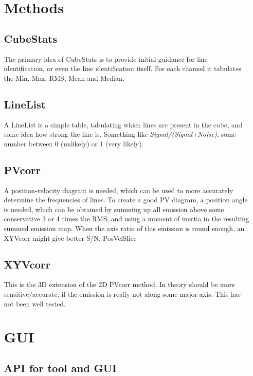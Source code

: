 \documentclass{report}
\begin{document}
\section{Methods}

\subsection{CubeStats}

The primary idea of CubeStats is to provide initial guidance for line
identification, or even the line identification itself. For each
channel it tabulates the Min, Max, RMS, Mean and Median.

\subsection{LineList}

A LineList is a simple table, tabulating which lines are present
in the cube, and some idea how strong the line is. Something like
{\it Signal/(Signal+Noise)}, some number between 0 (unlikely) or 1 
(very likely).


\subsection{PVcorr}

A position-velocity diagram is needed, which can be used to more
accurately determine the frequencies of lines.  To create a good
PV diagram, a position angle is needed, which can be obtained
by summing up all emission above some conservative 3 or 4 times
the RMS, and using a moment of inertia in the resulting summed
emission map.  When the axis ratio of this emission is round
enough, an XYVcorr might give better S/N.  PosVelSlice

\subsection{XYVcorr}

This is the 3D extension of the 2D PVcorr method. In theory should be
more sensitive/accurate, if the emission is really not along some
major axis. This has not been well tested.



\section{GUI}


\subsection{API for tool and GUI}
\end{document}
